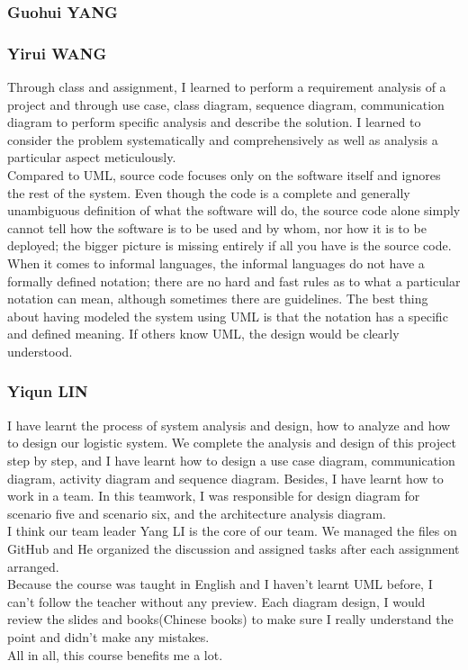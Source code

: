 \documentclass[12pt]{scrreprt}
\begin{document}
\subsubsection{Guohui YANG}


\subsubsection{Yirui WANG}
Through class and assignment, I learned to perform a requirement analysis of a project and through use case, class diagram, sequence diagram, communication diagram to perform specific analysis and describe the solution. I learned to consider the problem systematically and comprehensively as well as analysis a particular aspect meticulously.\\
Compared to UML, source code focuses only on the software itself and ignores the rest of the system. Even though the code is a complete and generally unambiguous definition of what the software will do, the source code alone simply cannot tell how the software is to be used and by whom, nor how it is to be deployed; the bigger picture is missing entirely if all you have is the source code. When it comes to informal languages, the informal languages do not have a formally defined notation; there are no hard and fast rules as to what a particular notation can mean, although sometimes there are guidelines. The best thing about having modeled the system using UML is that the notation has a specific and defined meaning. If others know UML, the design would be clearly understood.

\subsubsection{Yiqun LIN}
I have learnt the process of system analysis and design, how to analyze and how to design our logistic system. We complete the analysis and design of this project step by step, and I have learnt how to design a use case diagram, communication diagram, activity diagram and sequence diagram. Besides, I have learnt how to work in a team. In this teamwork, I was responsible for design diagram for scenario five and scenario six, and the architecture analysis diagram. \\
I think our team leader Yang LI is the core of our team. We managed the files on GitHub and He organized the discussion and assigned tasks after each assignment arranged. \\
Because the course was taught in English and I haven't learnt UML before, I can't follow the teacher without any preview. Each diagram design, I would review the slides and books(Chinese books) to make sure I really understand the point and didn't make any mistakes.\\
All in all, this course benefits me a lot.\\
\end{document}
